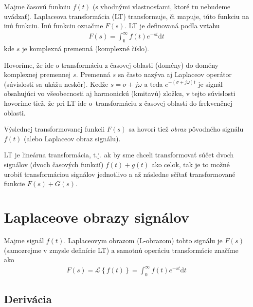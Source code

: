 \documentclass[a4paper, 10pt, ]{article}
\begin{document}
Majme časovú funkciu $f(t)$ (s vhodnými vlastnosťami, ktoré tu nebudeme uvádzať). Laplaceova transformácia (LT) transformuje, či mapuje, túto funkciu na inú funkciu. Inú funkciu označme $F(s)$. LT je definovaná podľa vzťahu
\begin{align}
    F(s) = \int_0^\infty f(t) e^{-st}\text{d}t
\end{align}
kde $s$ je komplexná premenná (komplexné číslo).


Hovoríme, že ide o transformáciu z časovej oblasti (domény) do domény komplexnej premennej $s$. Premenná $s$ sa často nazýva aj Laplaceov operátor (súvislosti sa ukážu neskôr). Keďže $s = \sigma + j\omega$ a teda $e^{-(\sigma + j\omega)t}$ je signál obsahujúci vo všeobecnosti aj harmonickú (kmitavú) zložku, v tejto súvislosti hovoríme tiež, že pri LT ide o~transformáciu z časovej oblasti do frekvenčnej oblasti.

Výslednej transformovanej funkcii $F(s)$ sa hovorí tiež \emph{obraz} pôvodného signálu $f(t)$ (alebo Laplaceov obraz signálu).

LT je lineárna transformácia, t.j. ak by sme chceli transformovať súčet dvoch signálov (dvoch časových funkcií) $f(t) + g(t)$ ako celok, tak je to možné urobiť transformáciou signálov jednotlivo a až následne sčítať transformované funkcie $F(s) + G(s)$.



\section{Laplaceove obrazy signálov}

Majme signál $f(t)$. Laplaceovym obrazom (L-obrazom) tohto signálu je $F(s)$ (samozrejme v zmysle definície LT) a samotnú operáciu transformácie značíme ako
\begin{align}
    F(s)  =  \mathcal L \left\{ f(t) \right\} = \int_0^\infty f(t) e^{-st}\text{d}t
\end{align}


\subsection{Derivácia}
\end{document}
